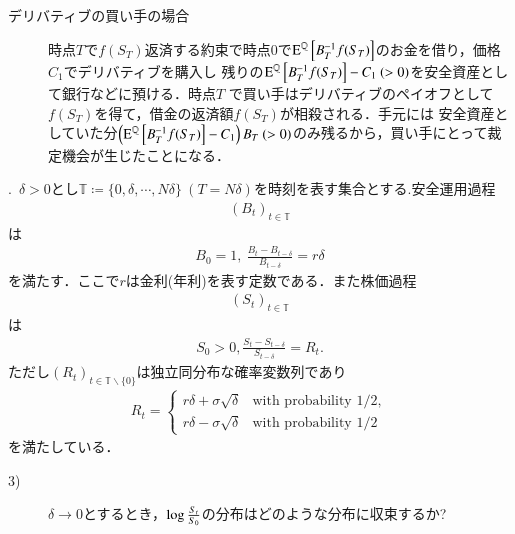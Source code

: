 \begin{description}
\begin{description}
		\item[デリバティブの買い手の場合] 
			時点$T$で$f(S_T)$返済する約束で時点$0$で$\Exp{B_T^{-1}f(S_T)}{}{\mathbb{Q}}$のお金を借り，価格$C_1$でデリバティブを購入し
			残りの$\Exp{B_T^{-1}f(S_T)}{}{\mathbb{Q}} - C_1\ (>0)$を安全資産として銀行などに預ける．時点$T$
			で買い手はデリバティブのペイオフとして$f(S_T)$を得て，借金の返済額$f(S_T)$が相殺される．手元には
			安全資産としていた分$\left(\Exp{B_T^{-1}f(S_T)}{}{\mathbb{Q}} - C_1\right)B_T\ (> 0)$のみ残るから，買い手にとって裁定機会が生じたことになる．
	\end{description}
\end{description}

.\ $\delta > 0$とし$\mathbb{T} \coloneqq \{ 0 ,\delta, \cdots, N\delta \}\ (T = N\delta)$を時刻を表す集合とする.安全運用過程
\begin{align}
	(B_t)_{t \in \mathbb{T}}
\end{align}
は
\begin{align}
	B_0 = 1,\ \frac{B_t - B_{t - \delta}}{B_{t - \delta}} = r \delta
\end{align}
を満たす．ここで$r$は金利(年利)を表す定数である．また株価過程
\begin{align}
	(S_t)_{t \in \mathbb{T}}
\end{align}
は
\begin{align}
	S_0 > 0, \frac{S_t - S_{t - \delta}}{S_{t - \delta}} = R_t.
\end{align}
ただし$(R_t)_{t \in \mathbb{T} \backslash \{0\}}$は独立同分布な確率変数列であり
\begin{align}
	R_t = \begin{cases}
		r \delta + \sigma \sqrt{\delta} & \mbox{with probability } 1/2, \\
		r \delta - \sigma \sqrt{\delta} & \mbox{with probability } 1/2
	\end{cases}
\end{align} 
を満たしている．
\begin{description}
	\item[3)] $\delta \rightarrow 0$とするとき，$\Log{\frac{S_t}{S_0}}$の分布はどのような分布に収束するか?
\end{description}

